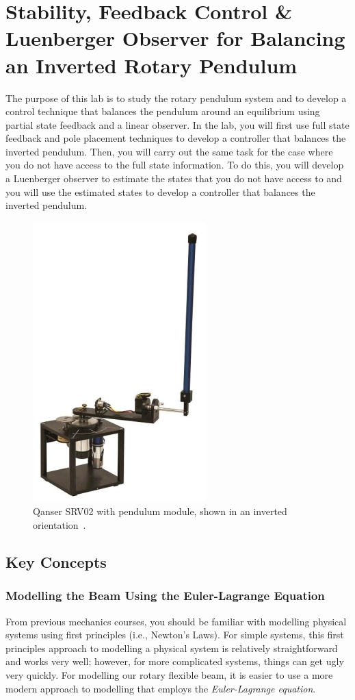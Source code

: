 \chapter{Stability, Feedback Control \& Luenberger Observer for Balancing an Inverted Rotary Pendulum}

The purpose of this lab is to study the rotary pendulum system and to develop a control technique that balances the pendulum around an equilibrium using partial state feedback and a linear observer. In the lab, you will first use full state feedback and pole placement techniques to develop a controller that balances the inverted pendulum. Then, you will carry out the same task for the case where you do not have access to the full state information. To do this, you will develop a Luenberger observer to estimate the states that you do not have access to and you will use the estimated states to develop a controller that balances the inverted pendulum.
\begin{figure}[htb!]
    \centering
    \includegraphics[width=.3\linewidth]{eps/lab_3/quanser.eps}
    \caption{Qanser SRV02 with pendulum module, shown in an inverted orientation~\cite{Q-Flex-Beam}.}
    \label{fig:lab3_plant}
\end{figure}

\section{Key Concepts}
\subsection{Modelling the Beam Using the Euler-Lagrange Equation}
From previous mechanics courses, you should be familiar with modelling physical systems using first principles (i.e., Newton's Laws). For simple systems, this first principles approach to modelling a physical system is relatively straightforward and works very well; however, for more complicated systems, things can get ugly very quickly. For modelling our rotary flexible beam, it is easier to use a more modern approach to modelling that employs the \emph{Euler-Lagrange equation}.

